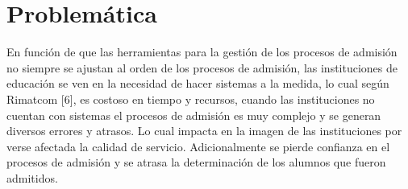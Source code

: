 \clearpage
\section{Problemática}

    En función de que las herramientas para la gestión de los procesos de admisión no siempre se ajustan al orden de los procesos de admisión, las instituciones de educación se ven en la necesidad de hacer sistemas a la medida, lo cual según  Rimatcom [6], es costoso en tiempo y recursos, cuando las instituciones no cuentan con sistemas el procesos de admisión es muy complejo y se generan diversos errores y atrasos. Lo cual impacta en la imagen de las instituciones por verse afectada la calidad de servicio. Adicionalmente se pierde confianza en el procesos de admisión y se atrasa la determinación de los alumnos que fueron admitidos.